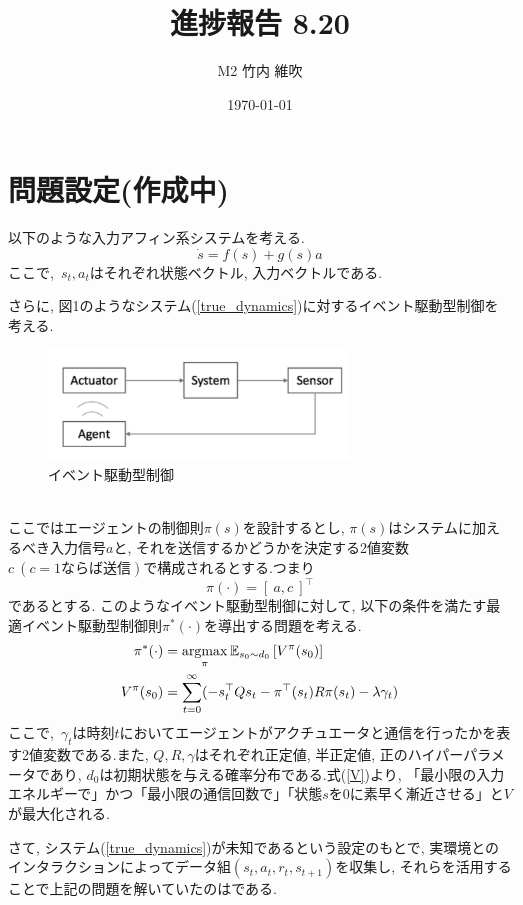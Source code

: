 \documentclass{jsarticle}
\title{\large{\bf{進捗報告 8.20}}}
\author{M2 竹内 維吹}
\date{\today}
\newcommand{\argmax}{\mathop{\rm argmax}\limits}
\newcommand{\expect}{\mathbb{E}}
\begin{document}
\maketitle


\section{問題設定(作成中)}
以下のような入力アフィン系システムを考える.
\begin{equation}
	\dot{s}=f(s)+g(s)a \label{true_dynamics}
\end{equation}
ここで,~$s_t, a_t$はそれぞれ状態ベクトル, 入力ベクトルである.\par
さらに, 図1のようなシステム(\ref{true_dynamics})に対するイベント駆動型制御を考える.
\begin{figure}[h]
	\centering
 	\includegraphics[width=8cm]{event.png}
 	\caption{イベント駆動型制御}
\end{figure}\\
ここではエージェントの制御則$\pi(s)$を設計するとし, $\pi(s)$はシステムに加えるべき入力信号$a$と, それを送信するかどうかを決定する2値変数$c~(c = 1 ならば送信)$で構成されるとする.つまり
\begin{equation}
	\pi(\cdot) = [~a, c~]^{\top}
\end{equation}
であるとする. このようなイベント駆動型制御に対して, 以下の条件を満たす最適イベント駆動型制御則$\pi^{*}(\cdot)$を導出する問題を考える.
\begin{align}
	\pi^{*}(\cdot) &= \argmax_{\pi}\expect_{s_0 \sim d_0}\left[V^{\pi} (s_0)\right] \label{optimal_policy}\\
	V^{\pi} (s_0) &=\sum_{t=0}^{\infty}(-s_t^{\top}Qs_t - \pi^{\top}(s_t)R\pi(s_t) - \lambda\gamma_t) \label{V}
\end{align}
ここで,~$\gamma_t$は時刻$t$においてエージェントがアクチュエータと通信を行ったかを表す2値変数である.また, $Q,R,\gamma$はそれぞれ正定値, 半正定値, 正のハイパーパラメータであり, $d_0$は初期状態を与える確率分布である.式(\ref{V})より, 「最小限の入力エネルギーで」かつ「最小限の通信回数で」「状態$s$を0に素早く漸近させる」と$V$が最大化される.\par
さて, システム(\ref{true_dynamics})が未知であるという設定のもとで, 実環境とのインタラクションによってデータ組$(s_t, a_t, r_t, s_{t+1})$を収集し, それらを活用することで上記の問題を解いていたのは\cite{event}である.\par
\end{document}
